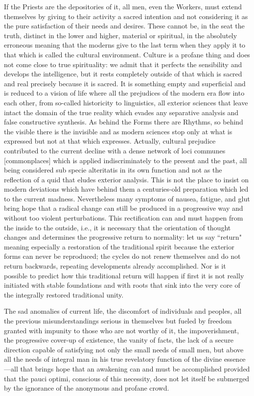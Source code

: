 If the Priests are the depositories of it, all men, even the Workers, must extend themselves by giving to their activity a sacred intention and not considering it as the pure satisfaction of their needs and desires. These cannot be, in the seat the truth, distinct in the lower and higher, material or spiritual, in the absolutely erroneous meaning that the moderns give to the last term when they apply it to that which is called the cultural environment. Culture is a profane thing and does not come close to true spirituality: we admit that it perfects the sensibility and develops the intelligence, but it rests completely outside of that which is sacred and real precisely because it is sacred. It is something empty and superficial and is reduced to a vision of life where all the prejudices of the modern era flow into each other, from so-called historicity to linguistics, all exterior sciences that leave intact the domain of the true reality which evades any separative analysis and false constructive synthesis. As behind the Forms there are Rhythms, so behind the visible there is the invisible and as modern sciences stop only at what is expressed but not at that which expresses. Actually, cultural prejudice contributed to the current decline with a dense network of loci communes [commonplaces] which is applied indiscriminately to the present and the past, all being considered sub specie alteritatis in its own function and not as the reflection of a quid that eludes exterior analysis. This is not the place to insist on modern deviations which have behind them a centuries-old preparation which led to the current madness. Nevertheless many symptoms of nausea, fatigue, and glut bring hope that a radical change can still be produced in a progressive way and without too violent perturbations. This rectification can and must happen from the inside to the outside, i.e., it is necessary that the orientation of thought changes and determines the progressive return to normality: let us say ``return" meaning especially a restoration of the traditional spirit because the exterior forms can never be reproduced; the cycles do not renew themselves and do not return backwards, repeating developments already accomplished. Nor is it possible to predict how this traditional return will happen if first it is not really initiated with stable foundations and with roots that sink into the very core of the integrally restored traditional unity.

The sad anomalies of current life, the discomfort of individuals and peoples, all the previous misunderstandings serious in themselves but fueled by freedom granted with impunity to those who are not worthy of it, the impoverishment, the progressive cover-up of existence, the vanity of facts, the lack of a secure direction capable of satisfying not only the small needs of small men, but above all the needs of integral man in his true revelatory function of the divine essence—all that brings hope that an awakening can and must be accomplished provided that the pauci optimi, conscious of this necessity, does not let itself be submerged by the ignorance of the anonymous and profane crowd.

